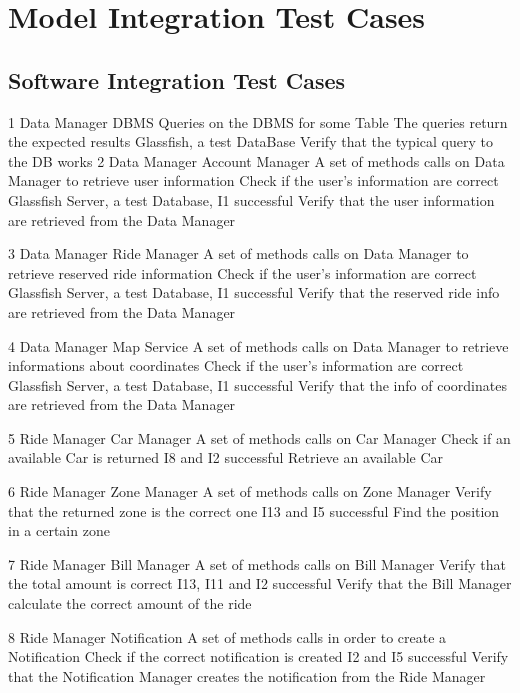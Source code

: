 \section{Model Integration Test Cases}
\subsection{Software Integration Test Cases}
\testCase
	{1}
	{Data Manager}
	{DBMS}
	{Queries on the DBMS for some Table }
	{The queries return the expected results}
	{Glassfish, a test DataBase}
	{Verify that the typical query to the DB works}
\testCase
	{2}
	{Data Manager}
	{Account Manager}
	{A set of methods calls on Data Manager to retrieve user information}
	{Check if the user's information are correct}
	{Glassfish Server, a test Database, I1 successful}
	{Verify that the user information are retrieved from the Data Manager}

\testCase
	{3}
	{Data Manager}
	{Ride Manager}
	{A set of methods calls on Data Manager to retrieve reserved ride information}
	{Check if the user's information are correct}
	{Glassfish Server, a test Database, I1 successful}
	{Verify that the reserved ride info are retrieved from the Data Manager}

\testCase
	{4}
	{Data Manager}
	{Map Service}
	{A set of methods calls on Data Manager to retrieve informations about coordinates}
	{Check if the user's information are correct}
	{Glassfish Server, a test Database, I1 successful}
	{Verify that the info of coordinates are retrieved from the Data Manager}

\testCase
	{5}
	{Ride Manager}
	{Car Manager}
	{A set of methods calls on Car Manager}
	{Check if an available Car is returned}
	{I8 and I2 successful}
	{Retrieve an available Car}

\testCase
	{6}
	{Ride Manager}
	{Zone Manager}
	{A set of methods calls on Zone Manager}
	{Verify that the returned zone is the correct one}
	{I13 and I5 successful}
	{Find the position in a certain zone}

\testCase
	{7}
	{Ride Manager}
	{Bill Manager}
	{A set of methods calls on Bill Manager}
	{Verify that the total amount is correct}
	{I13, I11 and I2 successful}
	{Verify that the Bill Manager calculate the correct amount of the ride}

\testCase
	{8}
	{Ride Manager}
	{Notification}
	{A set of methods calls in order to create a Notification}
	{Check if the correct notification is created}
	{I2 and I5 successful}
	{Verify that the Notification Manager creates the notification from the Ride Manager}


